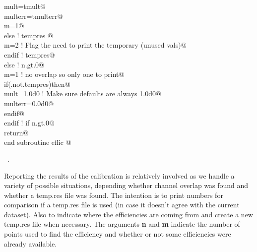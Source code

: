 \documentclass[10pt,a4paper,notitlepage]{article}
\newcommand{\var}[1]{\textbf{\textsf{#1}}} %
\begin{document}
\begin{flushleft}
\begin{list}{}{}
\mbox{}\verb@       mult=tmult@\\
\mbox{}\verb@       multerr=tmulterr@\\
\mbox{}\verb@       m=1@\\
\mbox{}\verb@      else ! tempres     @\\
\mbox{}\verb@       m=2                ! Flag the need to print the temporary (unused vals)@\\
\mbox{}\verb@      endif ! tempres@\\
\mbox{}\verb@      else ! n.gt.0@\\
\mbox{}\verb@        m=1               ! no overlap so only one to print@\\
\mbox{}\verb@        if(.not.tempres)then@\\
\mbox{}\verb@          mult=1.0d0   ! Make sure defaults are always 1.0d0@\\
\mbox{}\verb@          multerr=0.0d0@\\
\mbox{}\verb@        endif@\\
\mbox{}\verb@      endif   ! if n.gt.0@\\
\mbox{}\verb@      return@\\
\mbox{}\verb@      end subroutine effic                                                   @{\NWsep}
\end{list}
\vspace{-1.5ex}
\footnotesize
\begin{list}{}{\setlength{\itemsep}{-\parsep}\setlength{\itemindent}{-\leftmargin}}
\item \NWtxtMacroRefIn\ .

\item{}
\end{list}
\vspace{4ex}
\end{flushleft}
Reporting the results of the calibration is relatively involved as we handle
a variety of possible situations, depending whether channel overlap was
found and whether a temp.res file was found.
The intention is to print numbers for comparison if a temp.res file is 
used (in case it doesn't agree with the current dataset).
Also to indicate where the efficiencies are coming from and create a 
new temp.res file when necessary.
The arguments \var{n} and \var{m} indicate the number of points used
to find the efficiency and whether or not some efficiencies were already 
available.
\end{document}
